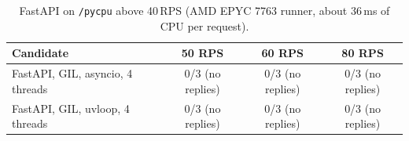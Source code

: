 \begin{table}[t]
\caption{FastAPI on \texttt{/pycpu} above 40\,RPS (AMD EPYC 7763 runner, about 36\,ms of CPU per request).}
\label{tab:pycpuhigh}
\centering\small
\begin{tabular}{lccc}
\toprule
Candidate & 50 RPS & 60 RPS & 80 RPS \\
\midrule
FastAPI, GIL, asyncio, 4 threads & 0/3 (no replies) & 0/3 (no replies) & 0/3 (no replies) \\
FastAPI, GIL, uvloop, 4 threads & 0/3 (no replies) & 0/3 (no replies) & 0/3 (no replies) \\
\bottomrule
\end{tabular}
\end{table}
